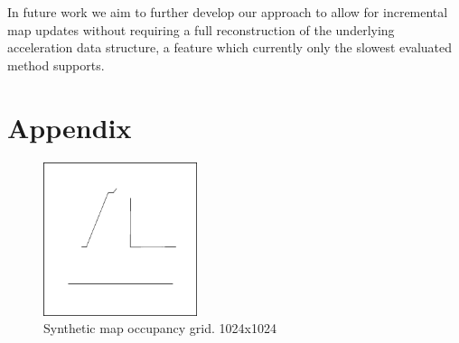 \documentclass[letterpaper, 10 pt, conference]{ieeeconf}  %
\newcommand{\img}[1]{\begin{center}\texttt{[image: \{\#1]}}\end{center}}
\begin{document}
In future work we aim to further develop our approach to allow for incremental map updates without requiring a full reconstruction of the underlying acceleration data structure, a feature which currently only the slowest evaluated method supports.
\addtolength{\textheight}{-2cm}   %

\section*{Appendix}

\begin{figure}[h!]
\begin{center}\includegraphics[width=4.5cm]{synthetic_border.png}\end{center}
\setlength{\belowcaptionskip}{-10pt}
\caption{Synthetic map occupancy grid. 1024x1024}
\label{violin:basement:grid}
\end{figure}
\end{document}
